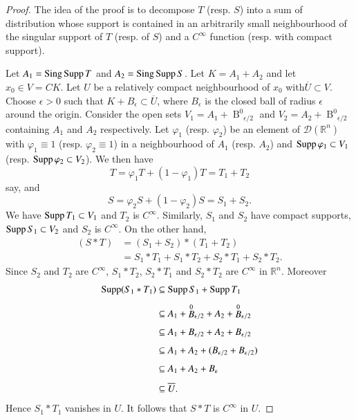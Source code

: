 \begin{proof}
The idea of the proof is to decompose $T$ (resp. $S$) into a sum of
distribution whose support is contained in an arbitrarily small
neighbourhood of the singular support of $T$ (resp. of $S$) and a
$C^{\infty}$ function (resp. with compact support).

Let $A_{1}=\operatorname{Sing} \operatorname{Supp} T$ and $A_{2}=\operatorname{Sing} \operatorname{Supp} S$. Let
$K=A_{1}+A_{2}$ and let $x_{0}\in V=CK$. Let $U$ be a relatively
compact neighbourhood of $x_{0}$ with\pageoriginale $\overline{U}\subset V$. Choose
$\epsilon>0$ such that $K+B_{\epsilon}\subset \overline{U}$, where
$B_{\epsilon}$ is the closed ball of radius $\epsilon$ around the
origin. Consider the open sets
$V_{1}=A_{1}+\displaystyle{\mathop{B}^{0}}_{\epsilon/2}$ and
$V_{2}=A_{2}+\displaystyle{\mathop{B}^{0}}_{\epsilon/2}$ containing
$A_{1}$ and $A_{2}$ respectively. Let $\varphi_{1}$
(resp. $\varphi_{2}$) be an element of $\mathcal{D}(\mathbb{R}^{n})$
with $\varphi_{1}\equiv 1$ (resp. $\varphi_{2}\equiv 1$) in a
neighbourhood of $A_{1}$ (resp. $A_{2}$) and $\operatorname{Supp} \varphi_{1}\subset
V_{1}$ (resp. $\operatorname{Supp} \varphi_{2}\subset V_{2}$). We then have
$$
T=\varphi_{1}T+(1-\varphi_{1})T=T_{1}+T_{2}
$$
say, and
$$
S=\varphi_{2}S+(1-\varphi_{2})S=S_{1}+S_{2}.
$$
We have $\operatorname{Supp} T_{1}\subset V_{1}$ and $T_{2}$ is
$C^{\infty}$. Similarly, $S_{1}$ and $S_{2}$ have compact supports,
$\operatorname{Supp} S_{1}\subset V_{2}$ and $S_{2}$ is $C^{\infty}$. On the other
hand,
\begin{align*}
(S\ast T) &=(S_{1}+S_{2})\ast (T_{1}+T_{2})\\[3pt]
&= S_{1}\ast T_{1}+S_{1}\ast T_{2}+S_{2}\ast T_{1}+S_{2}\ast T_{2}.
\end{align*}
Since $S_{2}$ and $T_{2}$ are $C^{\infty}$, $S_{1}\ast T_{2}$,
$S_{2}\ast T_{1}$ and $S_{2}\ast T_{2}$ are $C^{\infty}$ in
$\mathbb{R}^{n}$. Moreover
\begin{align*}
\operatorname{Supp} (S_{1}\ast T_{1}) &\subseteq \operatorname{Supp} S_{1}+\operatorname{Supp} T_{1}\\[4pt]
&\subseteq
A_{1}+\displaystyle{\mathop{B}^{0}}_{\epsilon/2}+A_{2}+\displaystyle{\mathop{B}^{0}}_{\epsilon/2}\\[4pt]
&\subseteq A_{1}+B_{\epsilon/2}+A_{2}+B_{\epsilon/2}\\[4pt]
&\subseteq A_{1}+A_{2}+(B_{\epsilon/2}+B_{\epsilon/2})\\[4pt]
&\subseteq A_{1}+A_{2}+B_{\epsilon}\\[4pt]
&\subseteq \overline{U}.
\end{align*}
Hence $S_{1}\ast T_{1}$ vanishes in $U$. It follows that $S\ast T$ is
$C^{\infty}$ in $U$.
\end{proof}

